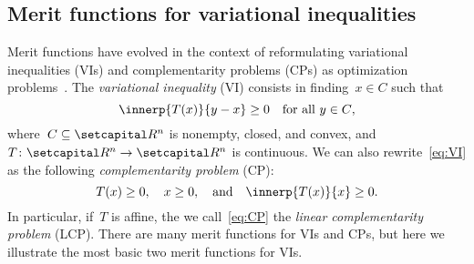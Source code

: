 \documentclass[../../main]{subfiles}
\begin{document}
\subsection{Merit functions for variational inequalities}
Merit functions have evolved in the context of reformulating variational inequalities (VIs) and complementarity problems (CPs) as optimization problems~\cite{Fukushima1996}.
The \emph{variational inequality} (VI) consists in finding~$x \in C$ such that
\[ \label{eq:VI}
    \innerp{T(x)}{y - x} \ge 0 \forallcondition{y \in C}
,\] 
where~$C \subseteq \setR^n$ is nonempty, closed, and convex, and~$T \colon \setR^n \to \setR^n$ is continuous.
We can also rewrite~\cref{eq:VI} as the following \emph{complementarity problem} (CP):
\[ \label{eq:CP}
    T(x) \ge 0, \quad x \ge 0, \eqand \innerp{T(x)}{x} \ge 0
.\] 
In particular, if~$T$ is affine, the we call~\cref{eq:CP} the \emph{linear complementarity problem} (LCP).
There are many merit functions for VIs and CPs, but here we illustrate the most basic two merit functions for VIs.
\end{document}
